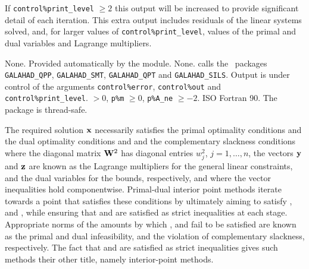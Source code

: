 \documentclass{galahad}
\newcommand{\packagename}{CLS}
\begin{document}
If {\tt control\%print\_level} $\geq 2$ this
output will be increased to provide significant detail of each iteration.
This extra output includes residuals of the linear systems solved, and,
for larger values of {\tt control\%print\_level}, values of the primal and dual
variables and Lagrange multipliers.


\galgeneral

\galcommon None.
\galworkspace Provided automatically by the module.
\galroutines None.
\galmodules {\tt \packagename\_solve} calls the \galahad\ packages
{\tt GALAHAD\_QPP},
{\tt GALAHAD\_SMT}, \sloppy
{\tt GALAHAD\_QPT} and
{\tt GALAHAD\_SILS}.
\galio Output is under control of the arguments
 {\tt control\%error}, {\tt control\%out} and {\tt control\%print\_level}.
 $> 0$,
{\tt p\%m} $\geq  0$, {\tt p\%A\_ne} $\geq -2$.
\galportability ISO Fortran 90. The package is thread-safe.


\galmethod
The required solution ${\mathbf{x}}$ necessarily satisfies
the primal optimality conditions
and
the dual optimality conditions
and
and the complementary slackness conditions
where the diagonal matrix ${\mathbf{W}}^{2}$ has diagonal entries $w_{j}^{2}$,
$j = 1, \ldots ,n$, the vectors ${\mathbf{y}}$ and ${\mathbf{z}}$ are
known as the Lagrange multipliers for
the general linear constraints, and the dual variables for the bounds,
respectively, and where the vector inequalities hold componentwise.
Primal-dual interior point methods iterate towards a point
that satisfies these conditions by ultimately aiming to satisfy
,  and , while ensuring that
 and  are
satisfied as strict inequalities at each stage.
Appropriate norms of the amounts by
which ,  and  fail to be satisfied are known as the
primal and dual infeasibility, and the violation of complementary slackness,
respectively. The fact that  and  are satisfied as strict
inequalities gives such methods their other title, namely
interior-point methods.
\end{document}
